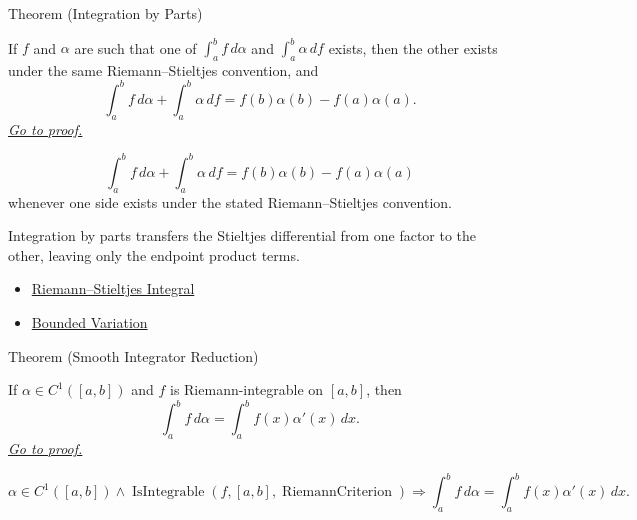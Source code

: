 \begin{theorembox}{Theorem (Integration by Parts)}
\begin{theorem}
\label{thm:rs-integration-by-parts}
If \(f\) and \(\alpha\) are such that one of
\(\int_a^b f\,d\alpha\) and \(\int_a^b \alpha\,df\) exists, then the other
exists under the same Riemann--Stieltjes convention, and
\[
  \int_a^b f\,d\alpha+\int_a^b \alpha\,df
  =
  f(b)\alpha(b)-f(a)\alpha(a).
\]
\hyperref[prf:rs-integration-by-parts]{\textit{Go to proof.}}
\end{theorem}
\end{theorembox}

\begin{remark*}
\[
\int_a^b f\,d\alpha+\int_a^b \alpha\,df
=
f(b)\alpha(b)-f(a)\alpha(a)
\]
whenever one side exists under the stated Riemann--Stieltjes convention.
\end{remark*}

\begin{remark*}[Interpretation]
Integration by parts transfers the Stieltjes differential from one factor to
the other, leaving only the endpoint product terms.
\end{remark*}

\begin{dependencies}
\begin{itemize}
  \item \hyperref[def:riemann-stieltjes-integral]{Riemann--Stieltjes Integral}
  \item \hyperref[def:bounded-variation-integration]{Bounded Variation}
\end{itemize}
\end{dependencies}

\begin{theorembox}{Theorem (Smooth Integrator Reduction)}
\begin{theorem}
\label{thm:rs-c1-reduction}
If \(\alpha\in C^1([a,b])\) and \(f\) is Riemann-integrable on \([a,b]\), then
\[
  \int_a^b f\,d\alpha=\int_a^b f(x)\alpha'(x)\,dx .
\]
\hyperref[prf:rs-c1-reduction]{\textit{Go to proof.}}
\end{theorem}
\end{theorembox}

\begin{remark*}
\[
\alpha\in C^1([a,b])\land\operatorname{IsIntegrable}(f,[a,b],\operatorname{RiemannCriterion})
\Longrightarrow
\int_a^b f\,d\alpha=\int_a^b f(x)\alpha'(x)\,dx.
\]
\end{remark*}

